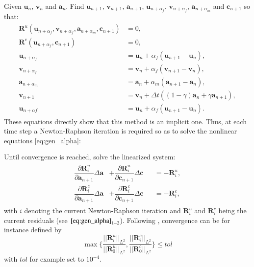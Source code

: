 Given $\mathbf{u}_{n}$, $\mathbf{v}_{n}$ and $\mathbf{a}_{n}$. Find $\mathbf{u}_{n+1}$, $\mathbf{v}_{n+1}$, $\mathbf{a}_{n+1}$, $\mathbf{u}_{n+\alpha_{f}}$, $\mathbf{v}_{n+\alpha_{f}}$, $\mathbf{a}_{n+\alpha_{m}}$ and $\mathbf{c}_{n+1}$ so that:
\begin{equation} \label{eq:gen_alpha}
\begin{aligned}
\begin{alignedat}{1}
        \mathbf{R}^{u}\left(\mathbf{u}_{n+\alpha_{f}},\mathbf{v}_{n+\alpha_{f}},\mathbf{a}_{n+\alpha_{m}},\mathbf{c}_{n+1}\right) &= 0, \\
    	\mathbf{R}^{c}\left(\mathbf{u}_{n+\alpha_{f}},\mathbf{c}_{n+1}\right) &= 0, \\
        \mathbf{u}_{n+\alpha_{f}} &= \mathbf{u}_{n}+\alpha_{f}\left(\mathbf{u}_{n+1}-\mathbf{u}_{n}\right), \\      
        \mathbf{v}_{n+\alpha_{f}} &= \mathbf{v}_{n}+\alpha_{f}\left(\mathbf{v}_{n+1}-\mathbf{v}_{n}\right), \\
        \mathbf{a}_{n+\alpha_{m}} &= \mathbf{a}_{n}+\alpha_{m}\left(\mathbf{a}_{n+1}-\mathbf{a}_{n}\right), \\
        \mathbf{v}_{n+1} &= \mathbf{v}_{n}+\Delta t\left(\left(1-\gamma\right)\mathbf{a}_{n}+\gamma\mathbf{a}_{n+1}\right), \\  
        \mathbf{u}_{n+\alpha f} &= \mathbf{u}_{n}+\alpha_{f}\left(\mathbf{u}_{n+1}-\mathbf{u}_{n}\right).
\end{alignedat}
\end{aligned}
\end{equation}
These equations directly show that this method is an implicit one. Thus, at each time step a Newton-Raphson iteration is required so as to solve the nonlinear equations \eqref{eq:gen_alpha}:

Until convergence is reached, solve the linearized system:
\begin{equation} \label{eq:NewtonRaphson}
	\begin{aligned}
	\begin{alignedat}{2}
		\dfrac{\partial\mathbf{R}_{i}^{u}}{\partial\mathbf{a}_{n+1}}\Delta \mathbf{a} &+ \dfrac{\partial\mathbf{R}_{i}^{u}}{\partial\mathbf{c}_{n+1}}\Delta\mathbf{c} &&= -\mathbf{R}_{i}^{u}, \\
		\dfrac{\partial\mathbf{R}_{i}^{c}}{\partial\mathbf{a}_{n+1}}\Delta \mathbf{a} &+ \dfrac{\partial\mathbf{R}_{i}^{c}}{\partial\mathbf{c}_{n+1}}\Delta\mathbf{c} &&= -\mathbf{R}_{i}^{c},
	\end{alignedat}
	\end{aligned}
\end{equation}
with $i$ denoting the current Newton-Raphson iteration and $\mathbf{R}_{i}^{u}$ and $\mathbf{R}_{i}^{c}$ being the current residuals (see $\eqref{eq:gen_alpha}_{1-2}$). Following \citet{01_PF_dyn_brittle}, convergence can be for instance defined by
\begin{equation} \label{eq:conv_cond}
	\max\{\frac{||\mathbf{R}_{i}^{u}||_{L^{2}}}{||\mathbf{R}_{0}^{u}||_{L^{2}}},\frac{||\mathbf{R}_{i}^{c}||_{L^{2}}}{||\mathbf{R}_{0}^{c}||_{L^{2}}}\}\leq tol
\end{equation}
with $tol$ for example set to $10^{-4}$.

